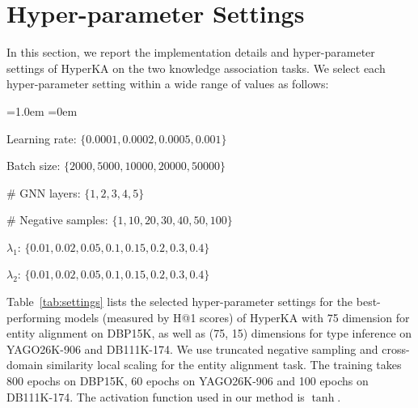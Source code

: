 \documentclass[11pt,a4paper]{article}
\newenvironment{noindlist}{
\begin{list}{\labelitemi}{
\leftmargin=1.0em 
\itemindent=0em 
\itemsep=2pt 
\parsep=1pt 
\parskip=1pt
}}{\end{list}}
\newcommand{\modelname}{HyperKA\xspace}
\begin{document}
\section{Hyper-parameter Settings}
\label{appendix:setting}
In this section, we report the implementation details and hyper-parameter settings of \modelname on the two knowledge association tasks. We select each hyper-parameter setting within a wide range of values as follows:

\begin{noindlist}
  \item Learning rate: $\{0.0001, 0.0002, 0.0005, 0.001\}$
  \item Batch size: $\{2000, 5000, 10000, 20000, 50000\}$
  \item \# GNN layers: $\{1, 2, 3, 4, 5\}$
  \item \# Negative samples: $\{1, 10, 20, 30, 40, 50, 100\}$
  \item $\lambda_1$: $\{0.01, 0.02, 0.05, 0.1, 0.15, 0.2, 0.3, 0.4\}$
  \item $\lambda_2$: $\{0.01, 0.02, 0.05, 0.1, 0.15, 0.2, 0.3, 0.4\}$
\end{noindlist}

\noindent
Table~\ref{tab:settings} lists the selected hyper-parameter settings for the best-performing models (measured by H@1 scores) of \modelname with 75 dimension for entity alignment on DBP15K, as well as (75, 15) dimensions for type inference on YAGO26K-906 and DB111K-174. We use truncated negative sampling and cross-domain similarity local scaling for the entity alignment task. The training takes 800 epochs on DBP15K, 60 epochs on YAGO26K-906 and 100 epochs on DB111K-174. The activation function used in our method is $\tanh$.

\begin{table}[ht]
\centering
{}
\caption{Selected values for hyper-parameters.}
\label{tab:settings}
\end{table}
 
\end{document}
